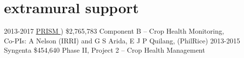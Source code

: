 \documentclass[]{friggeri-cv}
\begin{document}
\section{extramural support}
  \begin{entrylist}
  \entry
	{2013-2017}
	{\href{http://philippinericeinfo.ph}{PRISM })}
	{\$2,765,783}
	{Component B -- Crop Health Monitoring,\\Co-PIs: A Nelson (IRRI) and G S Arida, E J P Quilang, (PhilRice)}
  \entry
	{2013-2015}
	{Syngenta}
	{\$454,640}
	{Phase II, Project 2 -- Crop Health Management}
  \end{entrylist}


\end{document}
